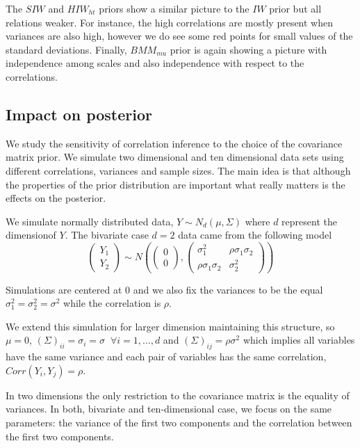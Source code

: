 \documentclass[a4paper]{article}
\begin{document}
The $SIW$ and $HIW_{ht}$ priors show a similar picture to the $IW$ prior but all relations weaker. For instance, the high correlations are mostly present when variances are also high, however we do see some red points for small values of the standard deviations. Finally,  $BMM_{mu}$ prior is again showing a picture with independence among scales and also independence with respect to the correlations. 

\subsection{Impact on posterior} 

We study the sensitivity of correlation inference to the choice of the covariance matrix prior. We simulate two dimensional and ten dimensional data sets using different correlations, variances and sample sizes. The main idea is that although the properties of the prior distribution are important what really matters is the effects on the posterior.

We simulate normally distributed data, $Y \sim N_d(\mu, \Sigma) $ where $d$ represent the dimensionof $Y$. The bivariate case $d=2$ data came from the following model 
\begin{equation}
\begin{pmatrix}  Y_1 \\ Y_2 \end{pmatrix} \sim 
N\left( \begin{pmatrix}  0 \\ 0 \end{pmatrix}, \begin{pmatrix}  \sigma_{1}^2 & \rho\sigma_{1}\sigma_{2} \\ \rho\sigma_{1}\sigma_{2} & \sigma_{2}^2 \end{pmatrix} \right)
\label{modsim}
\end{equation} 

Simulations are centered at 0 and we also fix the variances to be the equal $\sigma_{1}^2=\sigma_{2}^2=\sigma^2$ while the correlation is $\rho$.

We extend this simulation for larger dimension maintaining this structure, so $\mu= 0$, $(\Sigma)_{ii} = \sigma_{i}=\sigma \;\; \forall i=1,\ldots,d$ and $(\Sigma)_{ij} = \rho\sigma^2$ which implies all variables have the same variance and each pair of variables has the same correlation, $Corr(Y_{i}, Y_{j}) = \rho$. 

In two dimensions the only restriction to the covariance matrix is the equality of variances. In both, bivariate and ten-dimensional case, we focus on the same parameters: the variance of the first two components and the correlation between the first two components. 
\end{document}
